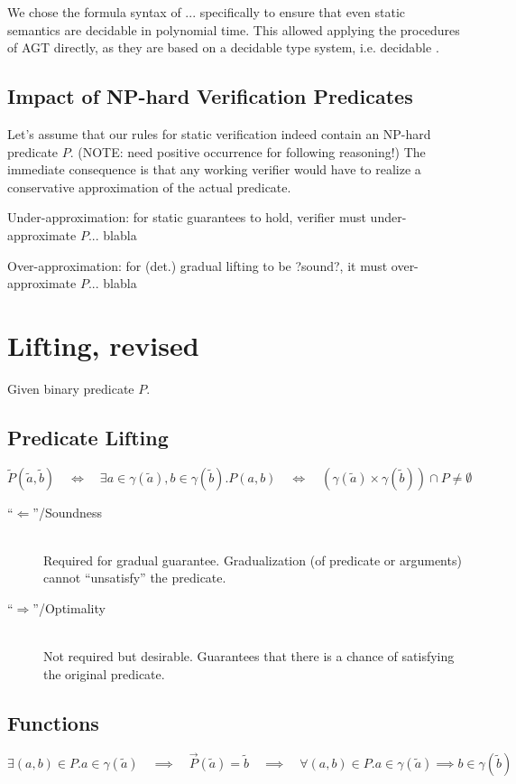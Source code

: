 \documentclass[11pt,a4paper]{article}
\newcommand{\grad}[1]{\widetilde{#1}}
\begin{document}
We chose the formula syntax of ... specifically to ensure that even static semantics are decidable in polynomial time.
This allowed applying the procedures of AGT directly, as they are based on a decidable type system, i.e. decidable .

\subsection{Impact of NP-hard Verification Predicates}
Let's assume that our rules for static verification indeed contain an NP-hard predicate $P$. (NOTE: need positive occurrence for following reasoning!)
The immediate consequence is that any working verifier would have to realize a conservative approximation of the actual predicate.

Under-approximation: for static guarantees to hold, verifier must under-approximate $P$... blabla

Over-approximation: for (det.) gradual lifting to be ?sound?, it must over-approximate $P$... blabla


\section{Lifting, revised}
Given binary predicate $P$.
\subsection{Predicate Lifting}
\begin{displaymath}
\grad{P}(\grad{a}, \grad{b}) 
\quad\iff\quad
\exists a \in \gamma(\grad{a}), b \in \gamma(\grad{b}). P(a, b)
\quad\iff\quad
(\gamma(\grad{a}) \times \gamma(\grad{b})) \cap P \neq \emptyset
\end{displaymath}

\begin{description}
    \item[“$\Leftarrow$”/Soundness]~\\
    Required for gradual guarantee.
    Gradualization (of predicate or arguments) cannot “unsatisfy” the predicate.
    
    \item[“$\Rightarrow$”/Optimality]~\\
    Not required but desirable. Guarantees that there is a chance of satisfying the original predicate.
\end{description}

\subsection{Functions}
\begin{displaymath}
\exists (a, b) \in P. a \in \gamma(\grad{a})
\quad\implies\quad
\vec{P}(\grad{a}) = \grad{b}
\quad\implies\quad
\forall (a, b) \in P. a \in \gamma(\grad{a}) \implies b \in \gamma(\grad{b})
\end{displaymath}
\end{document}
